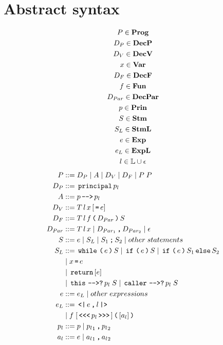 \section{Abstract syntax}

\begin{gather*}
  P       \in \mathbf{Prog}\\
  D_P     \in \mathbf{DecP}\\
  D_V     \in \mathbf{DecV}\\
  x       \in \mathbf{Var}\\
  D_F     \in \mathbf{DecF} \\
  f       \in \mathbf{Fun}\\
  D_{Par} \in \mathbf{DecPar}\\
  p       \in \mathbf{Prin}\\
  S       \in \mathbf{Stm}\\
  S_L     \in \mathbf{StmL}\\
  e       \in \mathbf{Exp}\\
  e_L     \in \mathbf{ExpL}\\
  l       \in \mathbb{L} \cup \epsilon\\
\end{gather*}
\begin{align*}
  P         & ::= D_P \gp A \gp D_V \gp D_F \gp P \; P \\
  D_P       & ::= \tk{principal} p_l \\
  A         & ::= p \tk{-{}->} p_l \\
  D_V       & ::= T \, l \, x \, [\tk = e] \\
  D_F       & ::= T \, l \, f \tk ( D_{Par} \tk ) S \\
  D_{Par}   & ::= T \, l \, x \gp D_{Par_1} \tk , D_{Par_2} \gp \epsilon \\
  S         & ::= e \gp S_L \gp S_1 \tk ; S_2 \gp other \; statements \\
  S_L       & ::= \tk{while} \tk ( e \tk ) S \gp \tk{if} \tk ( e \tk ) S \gp \tk{if} \tk ( e \tk ) S_1 \tk{else} S_2 \\
            & \gp x \tk = e \\
            & \gp \tk{return} [e] \\
            & \gp \tk{this} \tk{-{}->?} p_l \; S \gp \tk{caller} \tk{-{}->?} p_l \; S \\
  e         & ::= e_L \gp other \; expressions \\
  e_L       & ::= \tk{<|} e \tk , l \tk{|>} \\
            & \gp f \; [\tk{<{}<{}<} p_l \tk{>{}>{}>}] \tk ( [a_l] \tk ) \\
  p_l       & ::= p \gp {p_l}_1 \tk , {p_l}_2 \\
  a_l       & ::= e \gp {a_l}_1 \tk , {a_l}_2
\end{align*}
